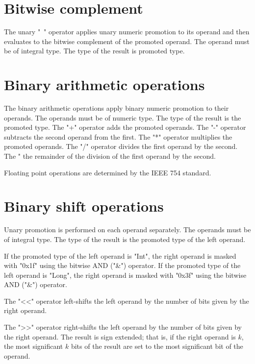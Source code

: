 \section{Bitwise complement}

 The unary \xcd"~" operator
applies unary numeric promotion to its operand
and then
 evaluates to the bitwise complement of
 the promoted operand.
  The operand must be of integral type.
The type of the result is promoted type.

\section{Binary arithmetic operations} 

The binary arithmetic operations apply binary numeric promotion
to their operands. The operands must be of numeric type.
The type of the result is the promoted type.
The
\xcd"+" operator adds the promoted operands. The \xcd"-" operator
subtracts the second operand from the first. The \xcd"*" operator
multiplies the  promoted  operands. The \xcd"/" operator
divides the
first  operand  by the second.
The \xcd"%
the remainder of the division of the first operand by the
second.

Floating point operations are determined by the IEEE 754
standard. 



\section{Binary shift operations}

Unary promotion is performed on each operand separately. 
The operands must be of integral type.
The type of the result is the promoted type of the left operand.

If the promoted type of the left operand is \xcd"Int",
the right operand is masked with \xcd"0x1f" using the bitwise
AND (\xcd"&") operator.
If the promoted type of the left operand is \xcd"Long",
the right operand is masked with \xcd"0x3f" using the bitwise
AND (\xcd"&") operator.

The \xcd"<<" operator left-shifts the left operand by the number of
bits given by the right operand.

The \xcd">>" operator right-shifts the left operand by the number of
bits given by the right operand.  The result is sign extended;
that is, if the right operand is $k$,
the most significant $k$ bits of the result are set to the most
significant bit of the operand.

